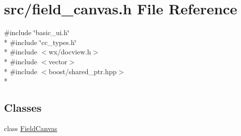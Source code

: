 \hypertarget{a00225}{\section{src/field\-\_\-canvas.h File Reference}
\label{a00225}
}
{\ttfamily \#include \char`\"{}basic\-\_\-ui.\-h\char`\"{}}\\*
{\ttfamily \#include \char`\"{}cc\-\_\-types.\-h\char`\"{}}\\*
{\ttfamily \#include $<$wx/docview.\-h$>$}\\*
{\ttfamily \#include $<$vector$>$}\\*
{\ttfamily \#include $<$boost/shared\-\_\-ptr.\-hpp$>$}\\*
\subsection*{Classes}
\begin{DoxyCompactItemize}
\item 
class \hyperlink{a00101}{Field\-Canvas}
\end{DoxyCompactItemize}
